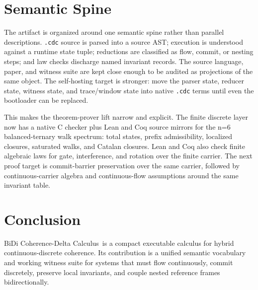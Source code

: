 \documentclass[11pt]{article}
\newcommand{\CDC}{BiDi Coherence-Delta Calculus}
\begin{document}
\section{Semantic Spine}

The artifact is organized around one semantic spine rather than parallel
descriptions. \texttt{.cdc} source is parsed into a source AST; execution is
understood against a runtime state tuple; reductions are classified as flow,
commit, or nesting steps; and law checks discharge named invariant records. The
source language, paper, and witness suite are kept close enough to be audited as
projections of the same object. The self-hosting target is stronger: move the
parser state, reducer state, witness state, and trace/window state into native
\texttt{.cdc} terms until even the bootloader can be replaced.

This makes the theorem-prover lift narrow and explicit. The finite discrete
layer now has a native C checker plus Lean and Coq source mirrors for the n=6
balanced-ternary walk spectrum: total states, prefix admissibility, localized
closures, saturated walks, and Catalan closures. Lean and Coq also check finite
algebraic laws for gate, interference, and rotation over the finite carrier. The
next proof target is commit-barrier preservation over the same carrier, followed
by continuous-carrier algebra and continuous-flow assumptions around the same
invariant table.

\section{Conclusion}

\CDC\ is a compact executable calculus for hybrid continuous-discrete coherence.
Its contribution is a unified semantic vocabulary and working witness suite for
systems that must flow continuously, commit discretely, preserve local
invariants, and couple nested reference frames bidirectionally.
\end{document}
